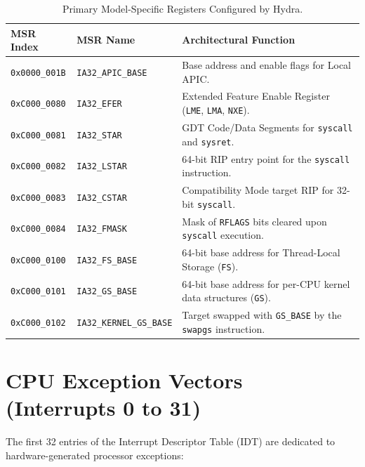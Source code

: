 \begin{table}[htbp]
\centering
\small
\begin{tabular}{lll}
\toprule
\textbf{MSR Index} & \textbf{MSR Name} & \textbf{Architectural Function} \\
\midrule
\texttt{0x0000\_001B} & \texttt{IA32\_APIC\_BASE} & Base address and enable flags for Local APIC. \\
\texttt{0xC000\_0080} & \texttt{IA32\_EFER} & Extended Feature Enable Register (\texttt{LME}, \texttt{LMA}, \texttt{NXE}). \\
\texttt{0xC000\_0081} & \texttt{IA32\_STAR} & GDT Code/Data Segments for \texttt{syscall} and \texttt{sysret}. \\
\texttt{0xC000\_0082} & \texttt{IA32\_LSTAR} & 64-bit RIP entry point for the \texttt{syscall} instruction. \\
\texttt{0xC000\_0083} & \texttt{IA32\_CSTAR} & Compatibility Mode target RIP for 32-bit \texttt{syscall}. \\
\texttt{0xC000\_0084} & \texttt{IA32\_FMASK} & Mask of \texttt{RFLAGS} bits cleared upon \texttt{syscall} execution. \\
\texttt{0xC000\_0100} & \texttt{IA32\_FS\_BASE} & 64-bit base address for Thread-Local Storage (\texttt{FS}). \\
\texttt{0xC000\_0101} & \texttt{IA32\_GS\_BASE} & 64-bit base address for per-CPU kernel data structures (\texttt{GS}). \\
\texttt{0xC000\_0102} & \texttt{IA32\_KERNEL\_GS\_BASE}& Target swapped with \texttt{GS\_BASE} by the \texttt{swapgs} instruction. \\
\bottomrule
\end{tabular}
\caption{Primary Model-Specific Registers Configured by Hydra.}
\label{tab:msr_complete}
\end{table}

\section{CPU Exception Vectors (Interrupts 0 to 31)}
\label{sec:cpu_exceptions}

The first 32 entries of the Interrupt Descriptor Table (IDT) are dedicated to hardware-generated processor exceptions:

